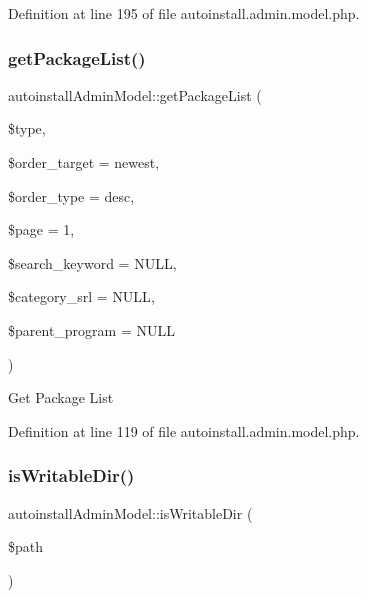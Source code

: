 Definition at line 195 of file autoinstall.\+admin.\+model.\+php.

\mbox{\label{classautoinstallAdminModel_ab0899e286869ec16acb00080daf311fb}} 
\subsubsection{\texorpdfstring{get\+Package\+List()}{getPackageList()}}
{\footnotesize\ttfamily autoinstall\+Admin\+Model\+::get\+Package\+List (\begin{DoxyParamCaption}\item[{}]{\$type,  }\item[{}]{\$order\+\_\+target = {\ttfamily \textquotesingle{}newest\textquotesingle{}},  }\item[{}]{\$order\+\_\+type = {\ttfamily \textquotesingle{}desc\textquotesingle{}},  }\item[{}]{\$page = {\ttfamily \textquotesingle{}1\textquotesingle{}},  }\item[{}]{\$search\+\_\+keyword = {\ttfamily NULL},  }\item[{}]{\$category\+\_\+srl = {\ttfamily NULL},  }\item[{}]{\$parent\+\_\+program = {\ttfamily NULL} }\end{DoxyParamCaption})}

Get Package List 

Definition at line 119 of file autoinstall.\+admin.\+model.\+php.

\mbox{\label{classautoinstallAdminModel_ab3314bacf64ba16ea88180124699fc54}} 
\subsubsection{\texorpdfstring{is\+Writable\+Dir()}{isWritableDir()}}
{\footnotesize\ttfamily autoinstall\+Admin\+Model\+::is\+Writable\+Dir (\begin{DoxyParamCaption}\item[{}]{\$path }\end{DoxyParamCaption})}




